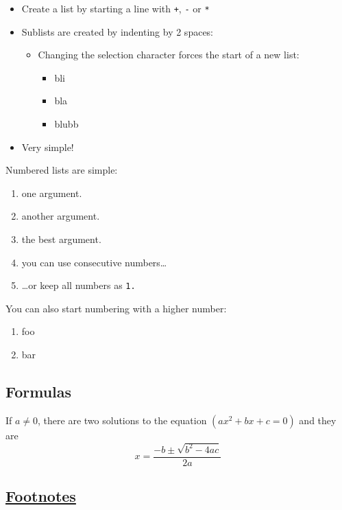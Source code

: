 \documentclass[
  stu,
  floatsintext,
  longtable,
  a4paper,
  nolmodern,
  notxfonts,
  notimes,
  colorlinks=true,linkcolor=black,citecolor=black,urlcolor=black]{apa7}
\providecommand{\tightlist}{%
  \setlength{\itemsep}{0pt}\setlength{\parskip}{0pt}}
\begin{document}
\begin{itemize}
\tightlist
\item
  Create a list by starting a line with \texttt{+}, \texttt{-} or
  \texttt{*}
\item
  Sublists are created by indenting by 2 spaces:

  \begin{itemize}
  \tightlist
  \item
    Changing the selection character forces the start of a new list:

    \begin{itemize}
    \tightlist
    \item
      bli
    \item
      bla
    \item
      blubb
    \end{itemize}
  \end{itemize}
\item
  Very simple!
\end{itemize}

Numbered lists are simple:

\begin{enumerate}
\def\labelenumi{\arabic{enumi}.}
\item
  one argument.
\item
  another argument.
\item
  the best argument.
\item
  you can use consecutive numbers\ldots{}
\item
  \ldots or keep all numbers as \texttt{1.}
\end{enumerate}

You can also start numbering with a higher number:

\begin{enumerate}
\def\labelenumi{\arabic{enumi}.}
\setcounter{enumi}{56}
\tightlist
\item
  foo
\item
  bar
\end{enumerate}

\subsection{Formulas}\label{formulas}

If \(a \ne 0\), there are two solutions to the equation
\((ax^2 + bx + c = 0)\) and they are
\[ x = \frac{-b \pm \sqrt{b^2-4ac}}{2a} \]

\subsection{\texorpdfstring{\href{https://github.com/markdown-it/markdown-it-footnote}{Footnotes}}{Footnotes}}\label{footnotes}
\end{document}
